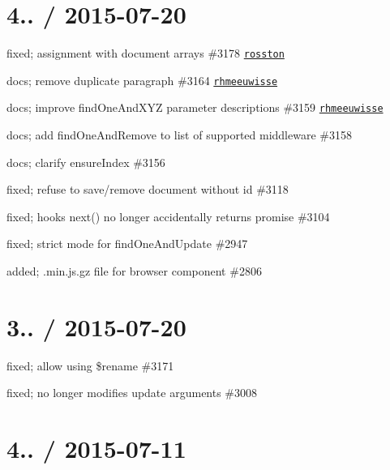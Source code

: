 \section*{4.. / 2015-\/07-\/20 }


\begin{DoxyItemize}
\item fixed; assignment with document arrays \#3178 \href{https://github.com/rosston}{\tt rosston}
\item docs; remove duplicate paragraph \#3164 \href{https://github.com/rhmeeuwisse}{\tt rhmeeuwisse}
\item docs; improve find\+One\+And\+X\+YZ parameter descriptions \#3159 \href{https://github.com/rhmeeuwisse}{\tt rhmeeuwisse}
\item docs; add find\+One\+And\+Remove to list of supported middleware \#3158
\item docs; clarify ensure\+Index \#3156
\item fixed; refuse to save/remove document without id \#3118
\item fixed; hooks next() no longer accidentally returns promise \#3104
\item fixed; strict mode for find\+One\+And\+Update \#2947
\item added; .min.\+js.\+gz file for browser component \#2806
\end{DoxyItemize}

\section*{3.. / 2015-\/07-\/20 }


\begin{DoxyItemize}
\item fixed; allow using \$rename \#3171
\item fixed; no longer modifies update arguments \#3008
\end{DoxyItemize}

\section*{4.. / 2015-\/07-\/11 }



